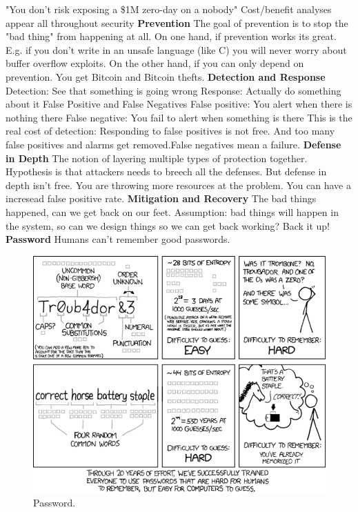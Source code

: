 \documentclass[11 pt]{scrartcl}
\begin{document}
    \ii "You don't risk exposing a \$1M zero-day on a nobody"
    \ii Cost/benefit analyses appear all throughout security
\itemend
\textbf{Prevention}\newline
The goal of prevention is to stop the "bad thing" from happening at all. On one hand, if prevention works its great. E.g. if you don't write in an unsafe language (like C) you will never worry about buffer overflow exploits. On the other hand, if you can only depend on prevention. You get Bitcoin and Bitcoin thefts.\newline
\textbf{Detection and Response}\newline
Detection: See that something is going wrong\newline
Response: Actually do something about it\newline
False Positive and False Negatives\newline
False positive: You alert when there is nothing there \newline
False negative: You fail to alert when something is there \newline
This is the real cost of detection:\newline
Responding to false positives is not free. And too many false positives and alarms get removed.False negatives mean a failure.\newline
\textbf{Defense in Depth}\newline
The notion of layering multiple types of protection together. Hypothesis is that attackers needs to breech all the defenses. But defense in depth isn't free. You are throwing more resources at the problem. You can have a incresead false positive rate.\newline
\textbf{Mitigation and Recovery}
The bad things happened, can we get back on our feet. Assumption: bad things will happen in the system, so can we design things so we can get back working? Back it up!\newline
\textbf{Password}\newline
Humans can't remember good passwords.\newline
\begin{figure}[!htb]
    \centering
    \includegraphics[scale=0.5]{assets/password.png}
    \caption{Password.}
\end{figure}
\end{document}
